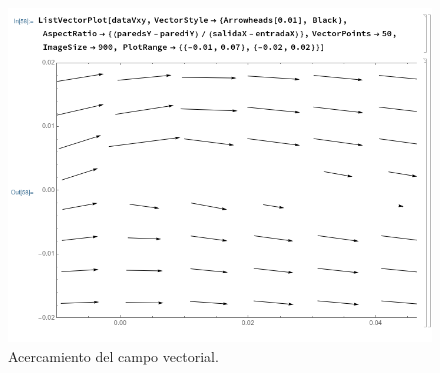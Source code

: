 \documentclass[12pt, letterpaper]{article}
\begin{document}
\begin{figure}[H]
	\centering
	\includegraphics[width=\textwidth]{25.png}
	\caption{Acercamiento del campo vectorial.}
\end{figure}
\end{document}
